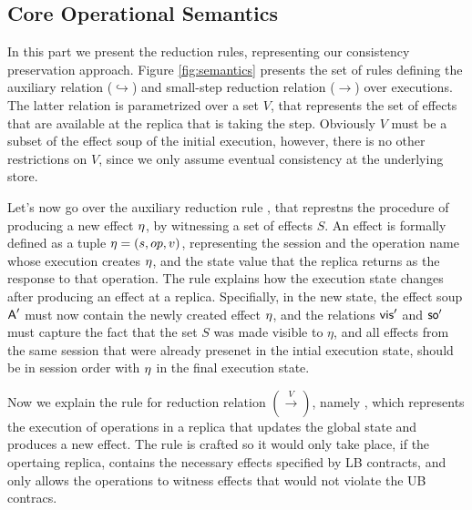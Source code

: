 \subsection{Core Operational Semantics}

In this part we present the reduction rules, representing our
consistency preservation approach.
Figure \ref{fig:semantics} presents the set of rules defining the
auxiliary relation ($\hookrightarrow$) and small-step reduction relation 
($\rightarrow$) over executions. The latter relation is parametrized
over a set $V$,
that represents the set of effects that are available at the replica
that is 
taking the step. Obviously $V$ must be a subset of the effect soup 
of the initial execution, however, there is no other restrictions on $V$,
since we only assume eventual consistency at the underlying store.

Let's now go over the auxiliary reduction rule
,
that represtns the procedure of producing a new effect $\eta$, by witnessing a set
of effects $S$. 
An effect is formally defined as a tuple $\eta=(s,op,v)$, representing the
session and the operation name 
whose execution creates $\eta$, and the state value
that the replica returns as the response to that operation.
The rule explains how the execution state changes after producing an
effect at a replica. Specifially, in the new state, the effect soup
${\normalfont \textsf{A}}'$ must
now contain the newly created effect $\eta$, and the relations ${\normalfont \textsf{vis}}'$
and ${\normalfont \textsf{so}}'$ must capture the fact that the set $S$ was made
visible to $\eta$, and all effects from the same session that were
already presenet in the intial execution state, should be in session
order with $\eta$ in the final execution state.


Now we explain the rule for reduction relation $(\xrightarrow{V})$,
namely , which represents the execution of operations
in a replica that updates the global state and produces a new
effect. The rule is crafted so it would only take place, if the
opertaing replica, contains the necessary effects specified by LB
contracts, and only allows the operations to witness effects that would
not violate the UB contracs.



